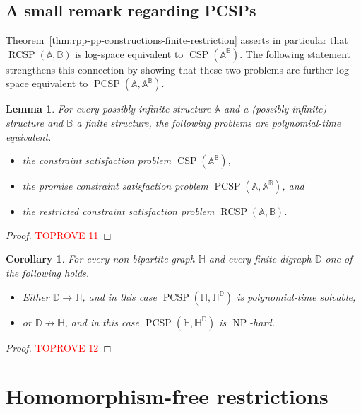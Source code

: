 \documentclass{article}
\newtheorem{lemma}[theorem]{Lemma}
\newtheorem{corollary}[theorem]{Corollary}
\theoremstyle{definition}
\theoremstyle{remark}
\DeclareMathOperator{\NP}{NP}
\DeclareMathOperator{\CSP}{CSP}
\DeclareMathOperator{\PCSP}{PCSP}
\DeclareMathOperator{\RCSP}{RCSP}
\newcommand{\bA}{{\mathbb A}}
\newcommand{\bB}{{\mathbb B}}
\newcommand{\bD}{{\mathbb D}}
\newcommand{\bH}{{\mathbb H}}
\begin{document}
\subsection{A small remark regarding PCSPs}

Theorem~\ref{thm:rpp-pp-constructions-finite-restriction} asserts in particular that
$\RCSP(\bA,\bB)$ is log-space equivalent to $\CSP(\bA^\bB)$. The following statement
strengthens this connection by showing that these two problems are further log-space
equivalent to $\PCSP(\bA,\bA^\bB)$.

\begin{lemma}\label{lem:RCSP-PCSP}
    For every possibly infinite structure $\bA$ and a (possibly infinite) structure and
    $\bB$ a finite structure, the following problems are polynomial-time equivalent.
    \begin{itemize}
        \item the constraint satisfaction problem $\CSP(\bA^\bB)$,
        \item the promise constraint satisfaction problem $\PCSP(\bA,\bA^\bB)$, and
        \item the restricted constraint satisfaction problem $\RCSP(\bA,\bB)$.
    \end{itemize}
\end{lemma}
\begin{proof}\textcolor{red}{TOPROVE 11}\end{proof}

\begin{corollary}
    For every non-bipartite graph $\bH$ and every finite digraph $\bD$ one of the following holds.
    \begin{itemize}
        \item Either $\bD\to \bH$, and in this case $\PCSP(\bH,\bH^\bD)$ is polynomial-time solvable, 
        \item or $\bD\not\to \bH$, and in this case $\PCSP(\bH,\bH^\bD)$ is $\NP$-hard.
    \end{itemize}
\end{corollary}
\begin{proof}\textcolor{red}{TOPROVE 12}\end{proof}



\section{Homomorphism-free restrictions}
\label{sect:FO-restrictions}
\end{document}
